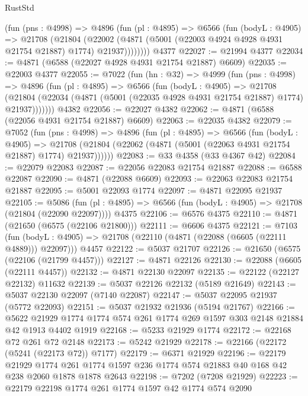 \begin{lexlean}{RustStd}
\begin{coremodule}
        (fun (pns : @4998) =>
        @4896
          (fun (pl : @4895) =>
          @6566
            (fun (bodyL : @4905) =>
            @21708
              (@21804
                (@22002 (@4871 (@5001 (@22003 @4924 @4928 @4931 @21754 @21887) @1774) @21937))))))))
    @4377
@22027 := @21994 @4377
@22034 := @4871 (@6588 (@22027 @4928 @4931 @21754 @21887) @6609)
@22035 := @22003 @4377
@22055 := @7022
    (fun (hn : @32) =>
    @4999
      (fun (pns : @4998) =>
      @4896
        (fun (pl : @4895) =>
        @6566
          (fun (bodyL : @4905) =>
          @21708
            (@21804 (@22034 (@4871 (@5001 (@22035 @4928 @4931 @21754 @21887) @1774) @21937)))))))
    @4382
@22056 := @22027 @4382
@22062 := @4871 (@6588 (@22056 @4931 @21754 @21887) @6609)
@22063 := @22035 @4382
@22079 := @7052
    (fun (pns : @4998) =>
    @4896
      (fun (pl : @4895) =>
      @6566
        (fun (bodyL : @4905) =>
        @21708 (@21804 (@22062 (@4871 (@5001 (@22063 @4931 @21754 @21887) @1774) @21937))))))
@22083 := @33 @4358 (@33 @4367 @42)
@22084 := @22079 @22083
@22087 := @22056 @22083 @21754 @21887
@22088 := @6588 @22087
@22090 := @4871 (@22088 @6609)
@22093 := @22063 @22083 @21754 @21887
@22095 := @5001 @22093 @1774
@22097 := @4871 @22095 @21937
@22105 := @5086
    (fun (pl : @4895) => @6566 (fun (bodyL : @4905) => @21708 (@21804 (@22090 @22097))))
    @4375
@22106 := @6576 @4375
@22110 := @4871 (@21650 (@6575 (@22106 @21800)))
@22111 := @6606 @4375
@22121 := @7103
    (fun (bodyL : @4905) => @21708 (@22110 (@4871 (@22088 (@6605 (@22111 @4889))) @22097)))
    @4457
@22122 := @5037 @21707
@22126 := @21650 (@6575 (@22106 (@21799 @4457)))
@22127 := @4871 @22126
@22130 := @22088 (@6605 (@22111 @4457))
@22132 := @4871 @22130 @22097
@22135 := @22122 (@22127 @22132) @11632
@22139 := @5037 @22126 @22132 (@5189 @21649)
@22143 := @5037 @22130 @22097 (@7140 @22087)
@22147 := @5037 @22095 @21937 (@5772 @22093)
@22151 := @5037 @21932 @21936 (@5194 @21767)
@22166 := @5622
    @21929
    @1774
    @1774
    @574
    @261
    @1774
    @269
    @1597
    @303
    @2148
    @21884
    @42
    @1913
    @4402
    @1919
@22168 := @5233 @21929 @1774
@22172 := @22168 @72 @261 @72 @2148
@22173 := @5242 @21929
@22178 := @22166 (@22172 (@5241 (@22173 @72)) @7177)
@22179 := @6371 @21929
@22196 := @22179
    @21929
    @1774
    @261
    @1774
    @1597
    @236
    @1774
    @574
    @21883
    @40
    @168
    @42
    @238
    @2060
    @1878
    @1878
    @2643
@22198 := @7202 (@7208 @21929)
@22223 := @22179
    @22198
    @1774
    @261
    @1774
    @1597
    @42
    @1774
    @574
    @2090

\end{coremodule}
\end{lexlean}
